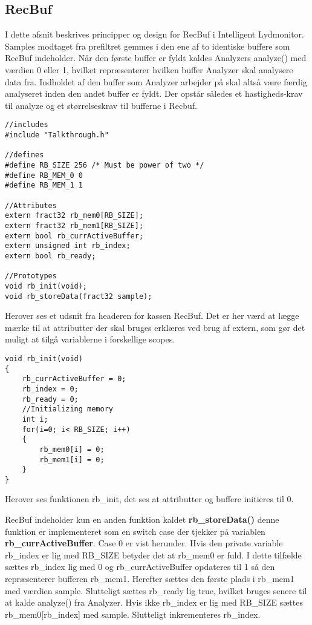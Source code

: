 \subsection*{RecBuf}
I dette afsnit beskrives principper og design for RecBuf i Intelligent Lydmonitor.
Samples modtaget fra prefiltret gemmes i den ene af to identiske buffere som RecBuf indeholder. Når den første buffer er fyldt kaldes Analyzers analyze() med værdien 0 eller 1, hvilket repræsenterer hvilken buffer Analyzer skal analysere data fra. Indholdet af den buffer som Analyzer arbejder på skal altså være færdig analyseret inden den andet buffer er fyldt. Der opstår således et hastigheds-krav til analyze og et størrelseskrav til bufferne i Recbuf. 

\begin{verbatim}
//includes
#include "Talkthrough.h"

//defines
#define RB_SIZE 256 /* Must be power of two */
#define RB_MEM_0 0
#define RB_MEM_1 1

//Attributes
extern fract32 rb_mem0[RB_SIZE];
extern fract32 rb_mem1[RB_SIZE];
extern bool rb_currActiveBuffer;
extern unsigned int rb_index;
extern bool rb_ready;

//Prototypes
void rb_init(void);
void rb_storeData(fract32 sample);
\end{verbatim}

Herover ses et udsnit fra headeren for kassen RecBuf. Det er her værd at lægge mærke til at attributter der skal bruges erklæres ved brug af extern, som gør det muligt at tilgå variablerne i forskellige scopes. 

\begin{verbatim}
void rb_init(void)
{
    rb_currActiveBuffer = 0;
    rb_index = 0;
    rb_ready = 0;
    //Initializing memory
    int i;
    for(i=0; i< RB_SIZE; i++)
    {
        rb_mem0[i] = 0;
        rb_mem1[i] = 0;
    }
}
\end{verbatim}

Herover ses funktionen rb\_init, det ses at attributter og buffere initieres til 0.

RecBuf indeholder kun en anden funktion kaldet \textbf{rb\_storeData()} denne funktion er implementeret som en switch case der tjekker på variablen \textbf{rb\_currActiveBuffer}. Case 0 er vist herunder. 
Hvis den private variable rb\_index er lig med RB\_SIZE betyder det at rb\_mem0 er fuld. I dette tilfælde sættes rb\_index lig med 0 og rb\_currActiveBuffer opdateres til 1 så den repræsenterer bufferen rb\_mem1. Herefter sættes den første plads i rb\_mem1 med værdien sample. Slutteligt sættes rb\_ready lig true, hvilket bruges senere til at kalde analyze() fra Analyzer. Hvis ikke rb\_index er lig med RB\_SIZE sættes rb\_mem0[rb\_index] med sample. Slutteligt inkrementeres rb\_index. 

